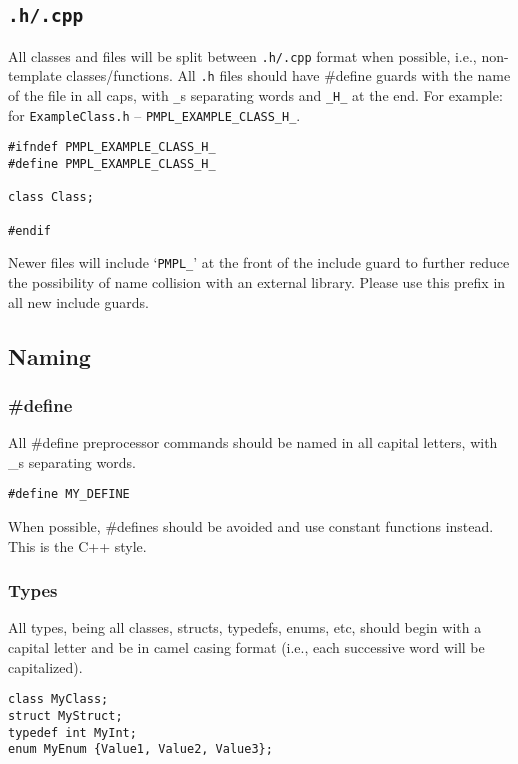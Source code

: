 \documentclass[12pt]{article}
\begin{document}
\subsection{\texttt{.h/.cpp}}
All classes and files will be split between \texttt{.h/.cpp} format when
possible, i.e., non-template classes/functions. All \texttt{.h} files should
have \#define guards with the name of the file in all caps, with \texttt{\_}s
separating words and \texttt{\_H\_} at the end. For example: for
\texttt{ExampleClass.h} -- \texttt{PMPL\_EXAMPLE\_CLASS\_H\_}.

\begin{lstlisting}
#ifndef PMPL_EXAMPLE_CLASS_H_
#define PMPL_EXAMPLE_CLASS_H_

class Class;

#endif
\end{lstlisting}

Newer files will include `\texttt{PMPL\_}' at the front of the include guard to
further reduce the possibility of name collision with an external library.
Please use this prefix in all new include guards.

\subsection{Naming}

\subsubsection{\#define}
All \#define preprocessor commands should be named in all capital letters, with
\_s separating words.

\begin{lstlisting}
#define MY_DEFINE
\end{lstlisting}

When possible, \#defines should be avoided and use constant functions instead.
This is the C++ style.

\subsubsection{Types}
All types, being all classes, structs, typedefs, enums, etc, should begin
with a capital letter and be in camel casing format (i.e., each successive word
will be capitalized).

\begin{lstlisting}[mathescape]
class MyClass;
struct MyStruct;
typedef int MyInt;
enum MyEnum {Value1, Value2, Value3};
\end{lstlisting}
\end{document}
